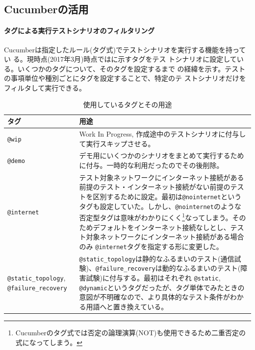   \subsection{Cucumberの活用}

    \paragraph{タグによる実行テストシナリオのフィルタリング}
Cucumberは指定したルール(タグ式)でテストシナリオを実行する機能を持ってい
る。現時点(2017年3月)時点ではに示すタグをテス
トシナリオに設定している。いくつかのタグについて、そのタグを設定するまで
の経緯を示す。テストの事項単位や種別ごとにタグを設定することで、特定のテ
ストシナリオだけをフィルタして実行できる。

\begin{table}[h]
 \centering
 \caption{使用しているタグとその用途}
 \label{tab:scenario_tags}
 \begin{tabularx}{\linewidth}{p{10em}|X}
  \hline
  タグ & 用途 \\
  \hline
  \hline
  \verb|@wip| & Work In Progress, 作成途中のテストシナリオに付与して実行スキップさせる。\\ \hline
  \verb|@demo| & デモ用にいくつかのシナリオをまとめて実行するために付与。一時的な利用だったのでその後削除。 \\ \hline
  \verb|@internet| & テスト対象ネットワークにインターネット接続がある前提のテスト・インターネット接続がない前提のテストを区別するために設定。最初は\verb|@nointernet|というタグも設定していた。しかし、\verb|@nointernet|のような否定型タグは意味がわかりにくく\footnote{Cucumberのタグ式では否定の論理演算(NOT)も使用できるため二重否定の式になってしまう。}なってしまう。そのためデフォルトをインターネット接続なしとし、テスト対象ネットワークにインターネット接続がある場合のみ \verb|@internet|タグを指定する形に変更した。 \\ \hline
  \verb|@static_topology|, \verb|@failure_recovery| & \verb|@static_topology|は静的なふるまいのテスト(通信試験)、\verb|@failure_recovery|は動的なふるまいのテスト(障害試験)に付与する。最初はそれぞれ \verb|@static|, \verb|@dynamic|というタグだったが、タグ単体でみたときの意図が不明確なので、より具体的なテスト条件がわかる用語へと置き換えている。\\
  \hline
 \end{tabularx}
\end{table}

